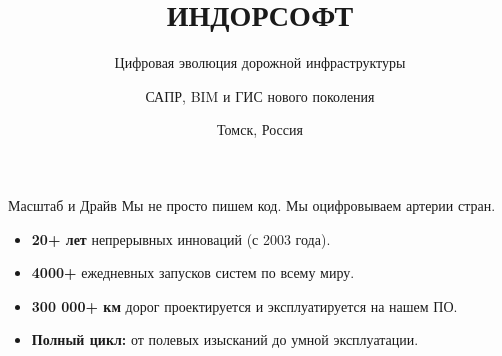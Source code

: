 \documentclass[aspectratio=169]{beamer}
\title{\textbf{ИНДОРСОФТ}}
\subtitle{Цифровая эволюция дорожной инфраструктуры}
\author{САПР, BIM и ГИС нового поколения}
\date{Томск, Россия}
\begin{document}
\begin{frame}
    \titlepage
\end{frame}

\begin{frame}{Масштаб и Драйв}
    Мы не просто пишем код. Мы оцифровываем артерии стран.
    \vspace{0.5cm}
    \begin{itemize}
        \item \textcolor{NeonGreen}{\textbf{20+ лет}} непрерывных инноваций (с 2003 года).
        \item \textcolor{NeonGreen}{\textbf{4000+}} ежедневных запусков систем по всему миру.
        \item \textcolor{NeonGreen}{\textbf{300 000+ км}} дорог проектируется и эксплуатируется на нашем ПО.
        \item \textbf{Полный цикл:} от полевых изысканий до умной эксплуатации.
    \end{itemize}
\end{frame}
\end{document}
